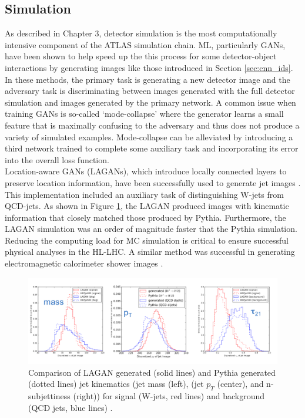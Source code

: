 \subsection{Simulation}
As described in Chapter 3, detector simulation is the most computationally intensive component of the ATLAS simulation chain. ML,  particularly GANs, have been shown to help speed up the this process for some detector-object interactions by generating images like those introduced in Section \ref{sec:cnn_ids}. In these methods, the primary task is generating a new detector image and the adversary task is discriminating between images generated with the full detector simulation and images generated by the primary network. A common issue when training GANs is so-called `mode-collapse' where the generator learns a small feature that is maximally confusing to the adversary and thus does not produce a variety of simulated examples. Mode-collapse can be alleviated by introducing a third network trained to complete some auxiliary task and incorporating its error into the overall loss function.\\

Location-aware GANs (LAGANs), which introduce locally connected layers to preserve location information, have been successfully used to generate jet images \cite{jet_gan}. This implementation included an auxiliary task of distinguishing W-jets from QCD-jets. As shown in Figure \ref{fig:lagan_plots}, the LAGAN produced images with kinematic information that closely matched those produced by Pythia. Furthermore, the LAGAN simulation was an order of magnitude faster that the Pythia simulation. Reducing the computing load for MC simulation is critical to ensure successful physical analyses in the HL-LHC. A similar method was successful in generating electromagnetic calorimeter shower images \cite{em_gan}. 

\begin{figure}[htb!]
    \centering
    \includegraphics[width=5in]{figures/chapter4/lagan_plots.png}
    \caption{Comparison of LAGAN generated (solid lines) and Pythia generated (dotted lines) jet kinematics (jet mass (left), (jet $p_T$ (center), and n-subjettiness (right)) for signal (W-jets, red lines) and background (QCD jets, blue lines) \cite{jet_gan}.}
    \label{fig:lagan_plots}
\end{figure}

